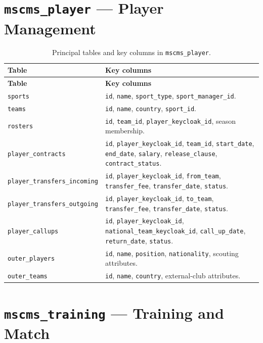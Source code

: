 \section{\texttt{mscms\_player} --- Player Management}
\label{app:schema-player}

\begin{longtable}{p{} p{}}
\caption{Principal tables and key columns in \texttt{mscms\_player}.}
\label{tab:schema-player}\\
\toprule
\textbf{Table} & \textbf{Key columns} \\
\midrule
\endfirsthead
\toprule
\textbf{Table} & \textbf{Key columns} \\
\midrule
\endhead
\bottomrule
\endlastfoot
\texttt{sports} & \texttt{id}, \texttt{name}, \texttt{sport\_type}, \texttt{sport\_manager\_id}. \\
\texttt{teams} & \texttt{id}, \texttt{name}, \texttt{country}, \texttt{sport\_id}. \\
\texttt{rosters} & \texttt{id}, \texttt{team\_id}, \texttt{player\_keycloak\_id}, season membership. \\
\texttt{player\_contracts} & \texttt{id}, \texttt{player\_keycloak\_id}, \texttt{team\_id}, \texttt{start\_date}, \texttt{end\_date}, \texttt{salary}, \texttt{release\_clause}, \texttt{contract\_status}. \\
\texttt{player\_transfers\_incoming} & \texttt{id}, \texttt{player\_keycloak\_id}, \texttt{from\_team}, \texttt{transfer\_fee}, \texttt{transfer\_date}, \texttt{status}. \\
\texttt{player\_transfers\_outgoing} & \texttt{id}, \texttt{player\_keycloak\_id}, \texttt{to\_team}, \texttt{transfer\_fee}, \texttt{transfer\_date}, \texttt{status}. \\
\texttt{player\_callups} & \texttt{id}, \texttt{player\_keycloak\_id}, \texttt{national\_team\_keycloak\_id}, \texttt{call\_up\_date}, \texttt{return\_date}, \texttt{status}. \\
\texttt{outer\_players} & \texttt{id}, \texttt{name}, \texttt{position}, \texttt{nationality}, scouting attributes. \\
\texttt{outer\_teams} & \texttt{id}, \texttt{name}, \texttt{country}, external-club attributes. \\
\end{longtable}

\section{\texttt{mscms\_training} --- Training and Match}
\label{app:schema-training}

